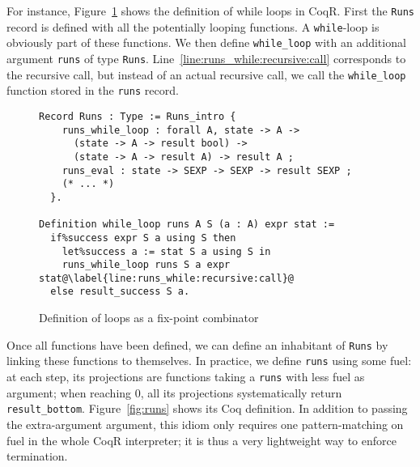 \documentclass[
    sigplan,
    10pt,
    review, %
    natbib=false %
 ]{acmart}
\newcommand\mb[1]{\todo[color=purple!20,size=\scriptsize]{#1}}
\newcommand\mbi[1]{\todo[color=purple!20,inline]{#1}}
\newcommand\CoqR{CoqR}
\begin{document}
For instance, Figure~\ref{fig:while_loop} shows the definition
of while loops in \CoqR{}.
First the \texttt{Runs} record is defined
with all the potentially looping functions.
A \texttt{while}-loop is obviously part of these functions.
We then define \texttt{while_loop} with an additional
argument \texttt{runs} of type \texttt{Runs}.
Line~\ref{line:runs_while:recursive:call} corresponds to the recursive call,
but instead of an actual recursive call,
we call the \texttt{while_loop} function stored
in the \texttt{runs} record.

\begin{figure}
\begin{verbatim}
Record Runs : Type := Runs_intro {
    runs_while_loop : forall A, state -> A ->
      (state -> A -> result bool) ->
      (state -> A -> result A) -> result A ;
    runs_eval : state -> SEXP -> SEXP -> result SEXP ;
    (* ... *)
  }.

Definition while_loop runs A S (a : A) expr stat :=
  if%success expr S a using S then
    let%success a := stat S a using S in
    runs_while_loop runs S a expr stat@\label{line:runs_while:recursive:call}@
  else result_success S a.
\end{verbatim}
\vspace{-1em}
    \caption{Definition of loops as a fix-point combinator}
    \label{fig:while_loop}
\end{figure}

Once all functions have been defined,
we can define an inhabitant of \texttt{Runs}
by linking these functions to themselves.
In practice, we define \texttt{runs} using some fuel:
at each step, its projections are functions taking a \texttt{runs}
with less fuel as argument;
when reaching \(0\), all its projections systematically return \texttt{result_bottom}.
Figure~\ref{fig:runs} shows its Coq definition.
%
In addition to passing the extra-argument argument, this idiom only requires one pattern-matching on fuel in the whole \CoqR{} interpreter; it is thus a very lightweight way to enforce termination.
\end{document}
